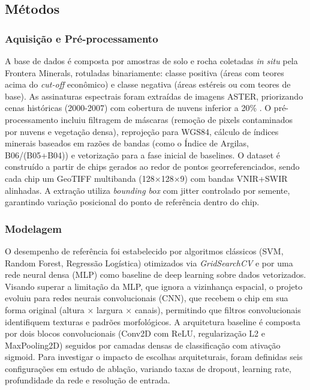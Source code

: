 \documentclass[12pt,twocolumn]{article}
\begin{document}
\subsection{Métodos}\label{muxe9todos}

\subsubsection{Aquisição e Pré-processamento}\label{aquisiuxe7uxe3o-e-pruxe9-processamento}

A base de dados é composta por amostras de solo e rocha coletadas \emph{in situ} pela Frontera Minerals, rotuladas binariamente: classe positiva (áreas com teores acima do \emph{cut-off} econômico) e classe negativa (áreas estéreis ou com teores de base). As assinaturas espectrais foram extraídas de imagens ASTER, priorizando cenas históricas (2000-2007) com cobertura de nuvens inferior a 20\% \cite{nasa_aster}. O pré-processamento incluiu filtragem de máscaras (remoção de pixels contaminados por nuvens e vegetação densa), reprojeção para WGS84, cálculo de índices minerais baseados em razões de bandas (como o Índice de Argilas, B06/(B05+B04)) e vetorização para a fase inicial de baselines. O dataset é construído a partir de chips gerados ao redor de pontos georreferenciados, sendo cada chip um GeoTIFF multibanda (128×128×9) com bandas VNIR+SWIR alinhadas. A extração utiliza \emph{bounding box} com jitter controlado por semente, garantindo variação posicional do ponto de referência dentro do chip.

\subsubsection{Modelagem}\label{modelagem}

O desempenho de referência foi estabelecido por algoritmos clássicos (SVM, Random Forest, Regressão Logística) otimizados via \emph{GridSearchCV} e por uma rede neural densa (MLP) como baseline de deep learning sobre dados vetorizados. Visando superar a limitação da MLP, que ignora a vizinhança espacial, o projeto evoluiu para redes neurais convolucionais (CNN), que recebem o chip em sua forma original (altura $\times$ largura $\times$ canais), permitindo que filtros convolucionais identifiquem texturas e padrões morfológicos. A arquitetura baseline é composta por dois blocos convolucionais (Conv2D com ReLU, regularização L2 e MaxPooling2D) seguidos por camadas densas de classificação com ativação sigmoid. Para investigar o impacto de escolhas arquiteturais, foram definidas seis configurações em estudo de ablação, variando taxas de dropout, learning rate, profundidade da rede e resolução de entrada.
\end{document}
